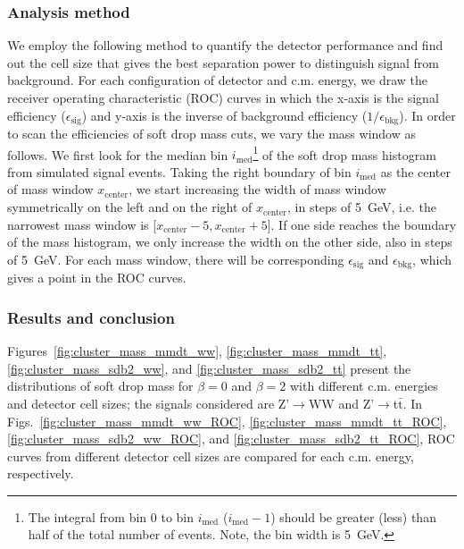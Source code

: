 \documentclass[12pt,twoside,a4paper,an,final]{cms-tdr}
\begin{document}
\subsubsection{Analysis method}\label{Analysis_method}
We employ the following method to quantify the detector performance and 
find out the cell size that gives the best separation power to distinguish 
signal from background. For each configuration of detector and c.m. energy, 
we draw the receiver operating characteristic (ROC) curves in which the x-axis
 is the signal efficiency ($\epsilon_\mathrm{sig}$) and y-axis is the inverse 
of background efficiency ($1/\epsilon_\mathrm{bkg}$). 
In order to scan the efficiencies of soft drop mass cuts, we vary the mass 
window as follows. We first look for the median bin 
$i_\mathrm{med}$\footnote{The integral from bin 0 to bin $i_\mathrm{med}$ 
($i_\mathrm{med}-1$) should be greater (less) than half 
of the total number of events. Note, the bin width is 5~GeV.} of the soft 
drop mass histogram from simulated signal events. Taking the right boundary
 of bin $i_\mathrm{med}$ as the center of mass window 
$x_\mathrm{center}$, we start increasing the width of mass window symmetrically
 on the left and on the right of $x_\mathrm{center}$, in steps of 5~GeV, 
i.e. the narrowest mass window is 
[$x_\mathrm{center}-5,x_\mathrm{center}+5$]. If one side reaches the boundary 
of the mass histogram, we only increase the width on the other side, also in 
steps of 5~GeV. For each mass window, there will be corresponding 
$\epsilon_\mathrm{sig}$ and $\epsilon_\mathrm{bkg}$, which gives a point in 
the ROC curves.

\subsubsection{Results and conclusion}
Figures~\ref{fig:cluster_mass_mmdt_ww}, \ref{fig:cluster_mass_mmdt_tt},
 \ref{fig:cluster_mass_sdb2_ww}, and \ref{fig:cluster_mass_sdb2_tt} 
present the distributions of soft drop mass for $\beta=0$ and $\beta=2$ with 
different c.m. energies and detector cell sizes; the signals considered are 
Z'$\rightarrow$WW and Z'$\rightarrow$t$\bar{\mathrm{t}}$. 
In Figs.~\ref{fig:cluster_mass_mmdt_ww_ROC}, \ref{fig:cluster_mass_mmdt_tt_ROC}, \ref{fig:cluster_mass_sdb2_ww_ROC}, and \ref{fig:cluster_mass_sdb2_tt_ROC}, 
ROC curves from different detector cell sizes are compared for each 
c.m. energy, respectively. 
\end{document}
